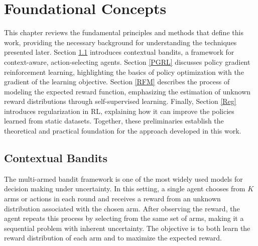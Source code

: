 \documentclass[./dissertation.tex]{subfiles}
\begin{document}
\chapter{Foundational Concepts}
This chapter reviews the fundamental principles and methods that define this work, providing the necessary background for understanding the techniques presented later. Section \ref{Framework} introduces contextual bandits, a framework for context-aware, action-selecting agents. Section \ref{PGRL} discusses policy gradient reinforcement learning, highlighting the basics of policy optimization with the gradient of the learning objective. Section \ref{RFM} describes the process of modeling the expected reward function, emphasizing the estimation of unknown reward distributions through self-supervised learning. Finally, Section \ref{Reg} introduces regularization in RL, explaining how it can improve the policies learned from static datasets. Together, these preliminaries establish the theoretical and practical foundation for the approach developed in this work.

\section{Contextual Bandits}
\label{Framework}
The multi-armed bandit \parencite{MABandit} framework is one of the most widely used models for decision making under uncertainty. In this setting, a single agent chooses from $K$ arms or actions in each round and receives a reward from an unknown distribution associated with the chosen arm. After observing the reward, the agent repeats this process by selecting from the same set of arms, making it a sequential problem with inherent uncertainty. The objective is to both learn the reward distribution of each arm and to maximize the expected reward.
\end{document}
